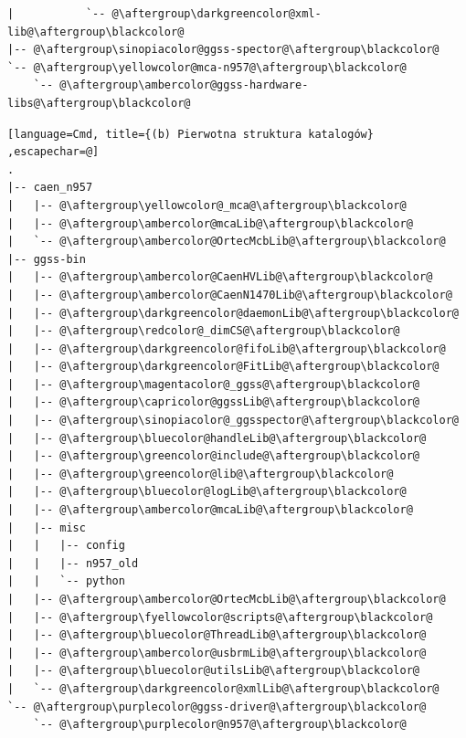 \begin{multicols*}{2}[]
\begin{lstlisting}[language=Cmd, title={(a) Aktualna struktura katalogów}, escapechar=@, label={lst:compareStructure}]
|           `-- @\aftergroup\darkgreencolor@xml-lib@\aftergroup\blackcolor@
|-- @\aftergroup\sinopiacolor@ggss-spector@\aftergroup\blackcolor@
`-- @\aftergroup\yellowcolor@mca-n957@\aftergroup\blackcolor@
    `-- @\aftergroup\ambercolor@ggss-hardware-libs@\aftergroup\blackcolor@
\end{lstlisting}
\vfill\null
\columnbreak
\begin{lstlisting}[language=Cmd, title={(b) Pierwotna struktura katalogów} ,escapechar=@]
.
|-- caen_n957
|   |-- @\aftergroup\yellowcolor@_mca@\aftergroup\blackcolor@
|   |-- @\aftergroup\ambercolor@mcaLib@\aftergroup\blackcolor@
|   `-- @\aftergroup\ambercolor@OrtecMcbLib@\aftergroup\blackcolor@
|-- ggss-bin
|   |-- @\aftergroup\ambercolor@CaenHVLib@\aftergroup\blackcolor@
|   |-- @\aftergroup\ambercolor@CaenN1470Lib@\aftergroup\blackcolor@
|   |-- @\aftergroup\darkgreencolor@daemonLib@\aftergroup\blackcolor@
|   |-- @\aftergroup\redcolor@_dimCS@\aftergroup\blackcolor@
|   |-- @\aftergroup\darkgreencolor@fifoLib@\aftergroup\blackcolor@
|   |-- @\aftergroup\darkgreencolor@FitLib@\aftergroup\blackcolor@
|   |-- @\aftergroup\magentacolor@_ggss@\aftergroup\blackcolor@
|   |-- @\aftergroup\capricolor@ggssLib@\aftergroup\blackcolor@
|   |-- @\aftergroup\sinopiacolor@_ggsspector@\aftergroup\blackcolor@
|   |-- @\aftergroup\bluecolor@handleLib@\aftergroup\blackcolor@
|   |-- @\aftergroup\greencolor@include@\aftergroup\blackcolor@
|   |-- @\aftergroup\greencolor@lib@\aftergroup\blackcolor@
|   |-- @\aftergroup\bluecolor@logLib@\aftergroup\blackcolor@
|   |-- @\aftergroup\ambercolor@mcaLib@\aftergroup\blackcolor@
|   |-- misc
|   |   |-- config
|   |   |-- n957_old
|   |   `-- python
|   |-- @\aftergroup\ambercolor@OrtecMcbLib@\aftergroup\blackcolor@
|   |-- @\aftergroup\fyellowcolor@scripts@\aftergroup\blackcolor@
|   |-- @\aftergroup\bluecolor@ThreadLib@\aftergroup\blackcolor@
|   |-- @\aftergroup\ambercolor@usbrmLib@\aftergroup\blackcolor@
|   |-- @\aftergroup\bluecolor@utilsLib@\aftergroup\blackcolor@
|   `-- @\aftergroup\darkgreencolor@xmlLib@\aftergroup\blackcolor@
`-- @\aftergroup\purplecolor@ggss-driver@\aftergroup\blackcolor@
    `-- @\aftergroup\purplecolor@n957@\aftergroup\blackcolor@
\end{lstlisting}

\end{multicols*}

\newpage

